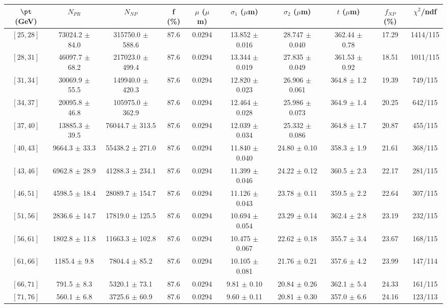 \begin{tabular}{c||c|c|c|c|c|c|c||c|c}
$\pt$ (GeV) & $N_{PR}$ & $N_{NP}$ & f (\%) & $\mu$ ($\mu$m) & $\sigma_1$ ($\mu$m) & $\sigma_2$ ($\mu$m)  & $t$ ($\mu$m) & $f_{NP}$ (\%) & $\chi^2$/ndf \\
\hline
$[25, 28]$ & 73024.2 $\pm$ 84.0 & 315750.0 $\pm$ 588.6 & 87.6 & 0.0294 & 13.852 $\pm$ 0.016 & 28.747 $\pm$ 0.040 & 362.44 $\pm$ 0.78 & 17.29 & 1414/115\\
$[28, 31]$ & 46097.7 $\pm$ 68.2 & 217023.0 $\pm$ 499.4 & 87.6 & 0.0294 & 13.344 $\pm$ 0.019 & 27.835 $\pm$ 0.049 & 361.53 $\pm$ 0.92 & 18.51 & 1011/115\\
$[31, 34]$ & 30069.9 $\pm$ 55.5 & 149940.0 $\pm$ 420.3 & 87.6 & 0.0294 & 12.820 $\pm$ 0.023 & 26.906 $\pm$ 0.061 & 364.8 $\pm$ 1.2 & 19.39 & 749/115\\
$[34, 37]$ & 20095.8 $\pm$ 46.8 & 105975.0 $\pm$ 362.9 & 87.6 & 0.0294 & 12.464 $\pm$ 0.028 & 25.986 $\pm$ 0.073 & 364.9 $\pm$ 1.4 & 20.25 & 642/115\\
$[37, 40]$ & 13885.3 $\pm$ 39.5 & 76044.7 $\pm$ 313.5 & 87.6 & 0.0294 & 12.039 $\pm$ 0.034 & 25.332 $\pm$ 0.086 & 364.8 $\pm$ 1.7 & 20.87 & 455/115\\
$[40, 43]$ & 9664.3 $\pm$ 33.3 & 55438.2 $\pm$ 271.0 & 87.6 & 0.0294 & 11.840 $\pm$ 0.040 & 24.80 $\pm$ 0.10 & 358.3 $\pm$ 1.9 & 21.61 & 368/115\\
$[43, 46]$ & 6962.8 $\pm$ 28.9 & 41288.3 $\pm$ 234.1 & 87.6 & 0.0294 & 11.399 $\pm$ 0.046 & 24.22 $\pm$ 0.12 & 360.5 $\pm$ 2.3 & 22.17 & 281/115\\
$[46, 51]$ & 4598.5 $\pm$ 18.4 & 28089.7 $\pm$ 154.7 & 87.6 & 0.0294 & 11.126 $\pm$ 0.043 & 23.78 $\pm$ 0.11 & 359.5 $\pm$ 2.2 & 22.64 & 307/115\\
$[51, 56]$ & 2836.6 $\pm$ 14.7 & 17819.0 $\pm$ 125.5 & 87.6 & 0.0294 & 10.694 $\pm$ 0.054 & 23.29 $\pm$ 0.14 & 362.4 $\pm$ 2.8 & 23.19 & 232/115\\
$[56, 61]$ & 1802.8 $\pm$ 11.8 & 11663.3 $\pm$ 102.8 & 87.6 & 0.0294 & 10.475 $\pm$ 0.067 & 22.62 $\pm$ 0.18 & 355.7 $\pm$ 3.4 & 23.67 & 168/115\\
$[61, 66]$ & 1185.4 $\pm$ 9.8 & 7804.4 $\pm$ 85.2 & 87.6 & 0.0294 & 10.105 $\pm$ 0.081 & 21.76 $\pm$ 0.21 & 357.6 $\pm$ 4.2 & 23.99 & 147/114\\
$[66, 71]$ & 791.5 $\pm$ 8.3 & 5320.1 $\pm$ 73.1 & 87.6 & 0.0294 & 9.81 $\pm$ 0.10 & 20.84 $\pm$ 0.26 & 362.1 $\pm$ 5.4 & 24.33 & 161/115\\
$[71, 76]$ & 560.1 $\pm$ 6.8 & 3725.6 $\pm$ 60.9 & 87.6 & 0.0294 & 9.60 $\pm$ 0.11 & 20.81 $\pm$ 0.30 & 357.0 $\pm$ 6.6 & 24.16 & 123/113\\

\end{tabular}

